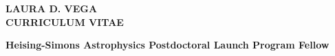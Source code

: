 \documentclass[12pt]{article}
\begin{document}
\pagestyle{fancy}
\fancyhf{}
\renewcommand{\headrulewidth}{0pt}


\begin{center} 
\bfseries{
\LARGE \uppercase{Laura D. Vega} \\
\large \uppercase{Curriculum Vitae}}
\end{center}

\noindent
\begin{center}{\bf Heising-Simons Astrophysics Postdoctoral Launch Program Fellow} \\
\end{center}
\end{document}

